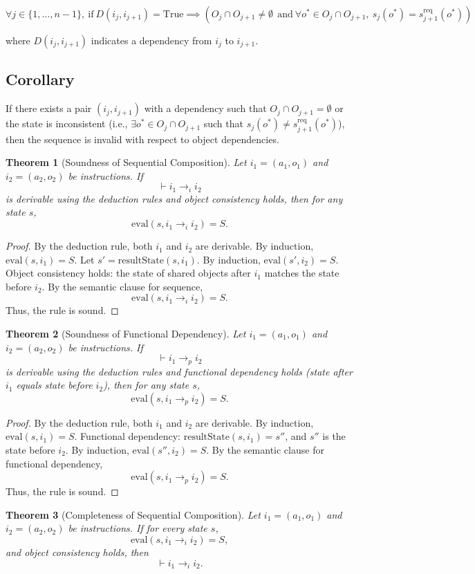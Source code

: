 \documentclass[a4paper,11pt]{lmcs}
\newtheorem{theorem}{Theorem}
\begin{document}
\[
\forall j \in \{1, \ldots, n-1\},\
\text{if}\ D(i_j, i_{j+1}) = \text{True}
\implies
\left( O_j \cap O_{j+1} \neq \emptyset\
\ \text{and}\
\forall o^* \in O_j \cap O_{j+1},\ s_j(o^*) = s_{j+1}^{\mathrm{req}}(o^*) \right)
\]

where $D(i_j, i_{j+1})$ indicates a dependency from $i_j$ to $i_{j+1}$.

\subsection*{Corollary}

If there exists a pair $(i_j, i_{j+1})$ with a dependency such that $O_j \cap O_{j+1} = \emptyset$
or the state is inconsistent (i.e., $\exists o^* \in O_j \cap O_{j+1}$ such that $s_j(o^*) \neq s_{j+1}^{\mathrm{req}}(o^*)$),
then the sequence is invalid with respect to object dependencies.


\begin{theorem}[Soundness of Sequential Composition]
Let $i_1 = (a_1, o_1)$ and $i_2 = (a_2, o_2)$ be instructions. If
\[
\vdash i_1 \rightarrow_i i_2
\]
is derivable using the deduction rules and object consistency holds, then for any state $s$,
\[
\text{eval}(s, i_1 \rightarrow_i i_2) = S.
\]
\end{theorem}

\begin{proof}
By the deduction rule, both $i_1$ and $i_2$ are derivable.
By induction, $\text{eval}(s, i_1) = S$.
Let $s' = \text{resultState}(s, i_1)$. By induction, $\text{eval}(s', i_2) = S$.
Object consistency holds: the state of shared objects after $i_1$ matches the state before $i_2$.
By the semantic clause for sequence,
\[
\text{eval}(s, i_1 \rightarrow_i i_2) = S.
\]
Thus, the rule is sound.
\end{proof}
\begin{theorem}[Soundness of Functional Dependency]
Let $i_1 = (a_1, o_1)$ and $i_2 = (a_2, o_2)$ be instructions. If
\[
\vdash i_1 \rightarrow_p i_2
\]
is derivable using the deduction rules and functional dependency holds (state after $i_1$ equals state before $i_2$), then for any state $s$,
\[
\text{eval}(s, i_1 \rightarrow_p i_2) = S.
\]
\end{theorem}

\begin{proof}
By the deduction rule, both $i_1$ and $i_2$ are derivable.
By induction, $\text{eval}(s, i_1) = S$.
Functional dependency: $\text{resultState}(s, i_1) = s''$, and $s''$ is the state before $i_2$.
By induction, $\text{eval}(s'', i_2) = S$.
By the semantic clause for functional dependency,
\[
\text{eval}(s, i_1 \rightarrow_p i_2) = S.
\]
Thus, the rule is sound.
\end{proof}
\begin{theorem}[Completeness of Sequential Composition]
Let $i_1 = (a_1, o_1)$ and $i_2 = (a_2, o_2)$ be instructions. If for every state $s$,
\[
\text{eval}(s, i_1 \rightarrow_i i_2) = S,
\]
and object consistency holds, then
\[
\vdash i_1 \rightarrow_i i_2.
\]
\end{theorem}
\end{document}
